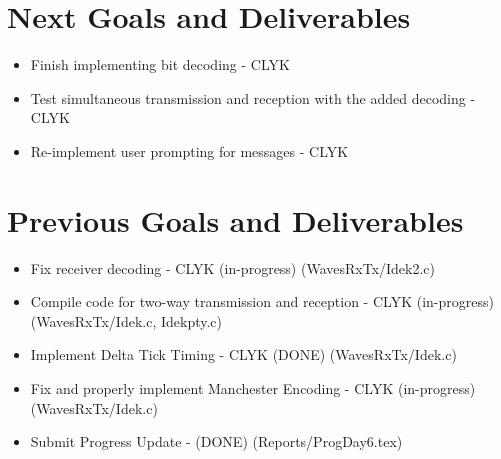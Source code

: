 \documentclass{article}
\begin{document}
\section*{Next Goals and Deliverables}
\begin{itemize}
\item Finish implementing bit decoding - CLYK
\item Test simultaneous transmission and reception with the added decoding - CLYK
\item Re-implement user prompting for messages - CLYK

\end{itemize}
\section*{Previous Goals and Deliverables}
\begin{itemize}
\item Fix receiver decoding - CLYK (in-progress) (WavesRxTx/Idek2.c)

\item Compile code for two-way transmission and reception - CLYK (in-progress) (WavesRxTx/Idek.c, Idekpty.c)

\item Implement Delta Tick Timing - CLYK (DONE) (WavesRxTx/Idek.c)

\item Fix and properly implement Manchester Encoding - CLYK (in-progress) (WavesRxTx/Idek.c)

\item Submit Progress Update - (DONE) (Reports/ProgDay6.tex)
\end{itemize}
\end{document}
